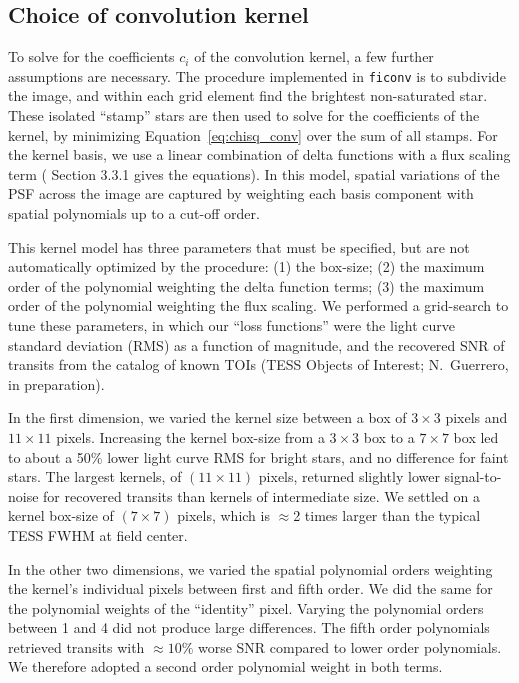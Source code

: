 \documentclass[12pt,twocolumn,tighten]{aastex62}
\begin{document}
\subsection{Choice of convolution kernel}
\label{subsec:tuneconvkernel}

To solve for the coefficients $c_i$ of the convolution kernel, a few
further assumptions are necessary.  The procedure implemented in
\texttt{ficonv} is to subdivide the image, and within each grid
element find the brightest non-saturated star. These isolated
``stamp'' stars are then used to solve for the coefficients of the
kernel, by minimizing Equation~\ref{eq:chisq_conv} over the sum of all
stamps.  For the kernel basis, we use a linear combination of delta
functions with a flux scaling term
(\citealt{soares-furtado_image_2017} Section 3.3.1 gives the
equations).  In this model, spatial variations of the PSF across the
image are captured by weighting each basis component with spatial
polynomials up to a cut-off order.

This kernel model has three parameters that must be specified, but are
not automatically optimized by the procedure: (1) the box-size; (2)
the maximum order of the polynomial weighting the delta function
terms; (3) the maximum order of the polynomial weighting the flux
scaling.  We performed a grid-search to tune these parameters, in
which our ``loss functions'' were the light curve standard deviation
(RMS) as a function of magnitude, and the recovered SNR of transits
from the catalog of known TOIs (TESS Objects of Interest; N.~Guerrero,
in preparation).

In the first dimension, we varied the kernel size between a box of
$3\times3$ pixels and $11\times11$ pixels.  Increasing the kernel
box-size from a $3\times3$ box to a $7\times7$ box led to about a 50\%
lower light curve RMS for bright stars, and no difference for faint
stars.  The largest kernels, of $(11\times11)$ pixels, returned
slightly lower signal-to-noise for recovered transits than kernels of
intermediate size.  We settled on a kernel box-size of $(7\times7)$
pixels, which is $\approx$2 times larger than the typical TESS FWHM at
field center. 

In the other two dimensions, we varied the spatial polynomial orders
weighting the kernel's individual pixels between first and fifth
order.  We did the same for the polynomial weights of the ``identity''
pixel.  Varying the polynomial orders between 1 and 4 did not produce
large differences.  The fifth order polynomials retrieved transits
with $\approx10\%$ worse SNR compared to lower order polynomials.  We
therefore adopted a second order polynomial weight in both terms.
\end{document}
